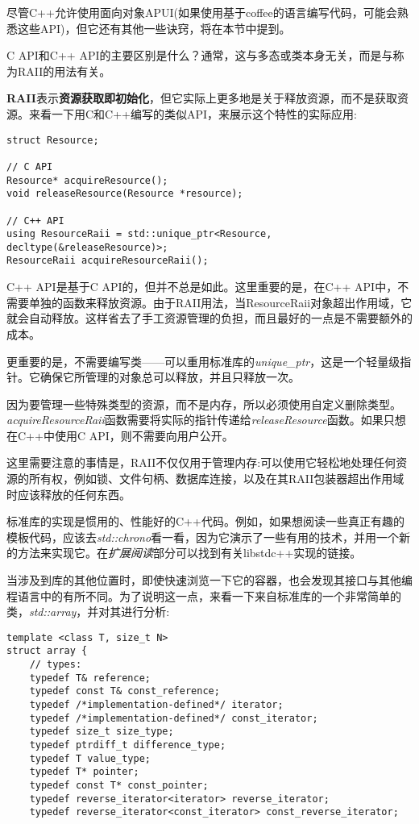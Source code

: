 
尽管C++允许使用面向对象APUI(如果使用基于coffee的语言编写代码，可能会熟悉这些API)，但它还有其他一些诀窍，将在本节中提到。


C API和C++ API的主要区别是什么？通常，这与多态或类本身无关，而是与称为RAII的用法有关。

\textbf{RAII}表示\textbf{资源获取即初始化}，但它实际上更多地是关于释放资源，而不是获取资源。来看一下用C和C++编写的类似API，来展示这个特性的实际应用:

\begin{lstlisting}[style=styleCXX]
struct Resource;

// C API
Resource* acquireResource();
void releaseResource(Resource *resource);

// C++ API
using ResourceRaii = std::unique_ptr<Resource, decltype(&releaseResource)>;
ResourceRaii acquireResourceRaii();
\end{lstlisting}

C++ API是基于C API的，但并不总是如此。这里重要的是，在C++ API中，不需要单独的函数来释放资源。由于RAII用法，当ResourceRaii对象超出作用域，它就会自动释放。这样省去了手工资源管理的负担，而且最好的一点是不需要额外的成本。

更重要的是，不需要编写类——可以重用标准库的\textit{unique\_ptr}，这是一个轻量级指针。它确保它所管理的对象总可以释放，并且只释放一次。

因为要管理一些特殊类型的资源，而不是内存，所以必须使用自定义删除类型。\textit{acquireResourceRaii}函数需要将实际的指针传递给\textit{releaseResource}函数。如果只想在C++中使用C API，则不需要向用户公开。

这里需要注意的事情是，RAII不仅仅用于管理内存:可以使用它轻松地处理任何资源的所有权，例如锁、文件句柄、数据库连接，以及在其RAII包装器超出作用域时应该释放的任何东西。


标准库的实现是惯用的、性能好的C++代码。例如，如果想阅读一些真正有趣的模板代码，应该去\textit{std::chrono}看一看，因为它演示了一些有用的技术，并用一个新的方法来实现它。在\textit{扩展阅读}部分可以找到有关libstdc++实现的链接。

当涉及到库的其他位置时，即使快速浏览一下它的容器，也会发现其接口与其他编程语言中的有所不同。为了说明这一点，来看一下来自标准库的一个非常简单的类，\textit{std::array}，并对其进行分析:

\begin{lstlisting}[style=styleCXX]
template <class T, size_t N>
struct array {
	// types:
	typedef T& reference;
	typedef const T& const_reference;
	typedef /*implementation-defined*/ iterator;
	typedef /*implementation-defined*/ const_iterator;
	typedef size_t size_type;
	typedef ptrdiff_t difference_type;
	typedef T value_type;
	typedef T* pointer;
	typedef const T* const_pointer;
	typedef reverse_iterator<iterator> reverse_iterator;
	typedef reverse_iterator<const_iterator> const_reverse_iterator;
\end{lstlisting}

